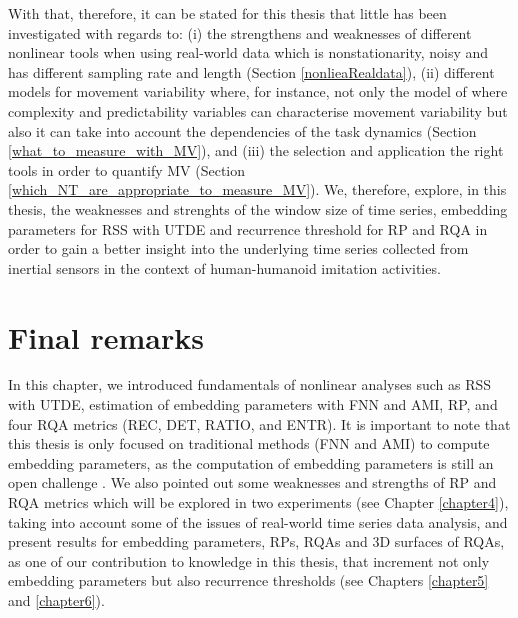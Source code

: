 With that, therefore, it can be stated for this thesis that little has 
been investigated with regards to: 
(i) the strengthens and weaknesses of different nonlinear tools when 
using real-world data which is nonstationarity, noisy and has different 
sampling rate and length (Section \ref{nonlieaRealdata}),
(ii) different models for movement variability where, for instance, 
not only the model of \cite{stergiou2006} where complexity and 
predictability variables can characterise movement 
variability but also it can take into account the dependencies of the 
task dynamics \citep{vaillancourt2002, vaillancourt2003} (Section 
\ref{what_to_measure_with_MV}), and 
(iii) the selection and application the right tools in order to quantify MV
(Section \ref{which_NT_are_appropriate_to_measure_MV}).
We, therefore, explore, in this thesis, the weaknesses and strenghts of 
the window size of time series, embedding parameters for RSS with UTDE 
and recurrence threshold for RP and RQA in order to gain a 
better insight into the underlying time series collected from inertial 
sensors in the context of human-humanoid imitation activities.


\section{Final remarks}
In this chapter, we introduced fundamentals of nonlinear analyses such 
as RSS with UTDE, estimation of embedding parameters with FNN and AMI, RP, 
and four RQA metrics (REC, DET, RATIO, and ENTR). 
It is important to note that this thesis is only focused on 
traditional methods (FNN and AMI) to compute embedding parameters,
as the computation of embedding parameters 
is still an open challenge \citep{uzal2011, gomezgarcia2014}.
We also pointed out some weaknesses and strengths of RP and RQA metrics
which will be explored in two experiments (see Chapter \ref{chapter4}), 
taking into account some of the issues of real-world time series 
data analysis, and present results for embedding parameters, RPs, RQAs and
3D surfaces of RQAs, as one of our contribution to knowledge in this thesis,
that increment not only embedding parameters \citep{iwanski1998} 
but also recurrence thresholds 
(see Chapters \ref{chapter5} and \ref{chapter6}).


